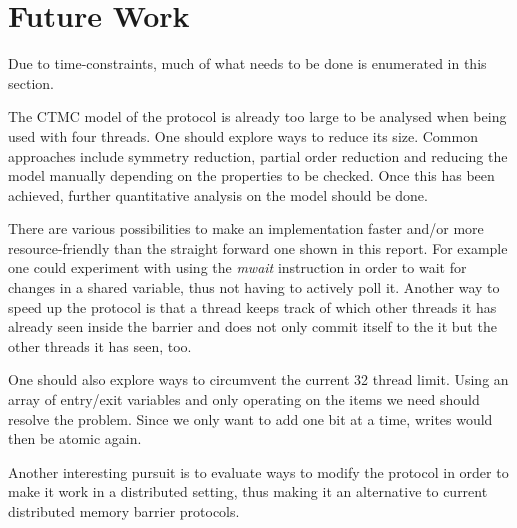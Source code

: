 \documentclass[a4paper, 10pt]{article}
\begin{document}
\section{Future Work}
Due to time-constraints, much of what needs to be done is enumerated in this section.

The CTMC model of the protocol is already too large to be analysed when being used with four threads. One should explore ways to reduce its size. Common approaches include symmetry reduction, partial order reduction and reducing the model manually depending on the properties to be checked. Once this has been achieved, further quantitative analysis on the model should be done.

There are various possibilities to make an implementation faster and/or more resource-friendly than the straight forward one shown in this report. For example one could experiment with using the \emph{mwait} instruction in order to wait for changes in a shared variable, thus not having to actively poll it. Another way to speed up the protocol is that a thread keeps track of which other threads it has already seen inside the barrier and does not only commit itself to the it but the other threads it has seen, too.

One should also explore ways to circumvent the current 32 thread limit. Using an array of entry/exit variables and only operating on the items we need should resolve the problem. Since we only want to add one bit at a time, writes would then be atomic again.

Another interesting pursuit is to evaluate ways to modify the protocol in order to make it work in a distributed setting, thus making it an alternative to current distributed memory barrier protocols.

\nocite{*} %

{}
\end{document}
